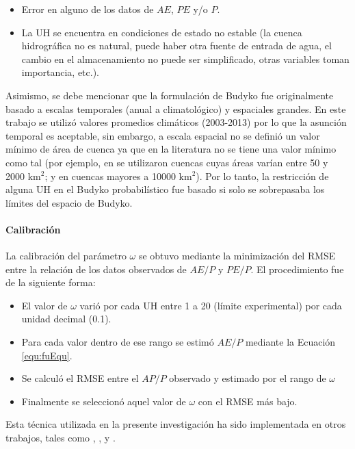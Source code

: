 \documentclass[12pt]{article}
\begin{document}
\begin{itemize}
    \item Error en alguno de los datos de $AE$, $PE$ y/o $P$.
    \item La UH se encuentra en condiciones de estado no estable (la cuenca hidrográfica no es natural, puede haber otra fuente de entrada de agua, el cambio en el almacenamiento no puede ser simplificado, otras variables toman importancia, etc.).
\end{itemize}

Asimismo, se debe mencionar que la formulación de Budyko fue originalmente basado a escalas temporales (anual a climatológico) y espaciales grandes. En este trabajo se utilizó valores promedios climáticos (2003-2013) por lo que la asunción temporal es aceptable, sin embargo, a escala espacial no se definió un valor mínimo de área de cuenca ya que en la literatura no se tiene una valor mínimo como tal (por ejemplo, en \citet{Zhang2004} se utilizaron cuencas cuyas áreas varían entre 50 y 2000 km$^{2}$; y en \citet{budyko1958heat} cuencas mayores a 10000 km$^{2}$). Por lo tanto, la restricción de alguna UH en el Budyko probabilístico fue basado si solo se sobrepasaba los límites del espacio de Budyko.

\paragraph{Calibración}\mbox{}

La calibración del parámetro $\omega$ se obtuvo mediante la minimización del RMSE entre la relación de los datos observados de $AE/P$ y $PE/P$. El procedimiento fue de la siguiente forma:

\begin{itemize}
  \item El valor de $\omega$ varió por cada UH entre 1 a 20 (límite experimental) por cada unidad decimal (0.1).
  \item Para cada valor dentro de ese rango se estimó $AE/P$ mediante la Ecuación \ref{equ:fuEqu}.
  \item Se calculó el RMSE entre el $AP/P$ observado y estimado por el rango de $\omega$
  \item Finalmente se seleccionó aquel valor de $\omega$ con el RMSE más bajo.
\end{itemize}

Esta técnica utilizada en la presente investigación ha sido implementada en otros trabajos, tales como \citet{Zhang2004}, \citet{xiong2012appraisal}, y \citet{Singh2015}.
\end{document}
